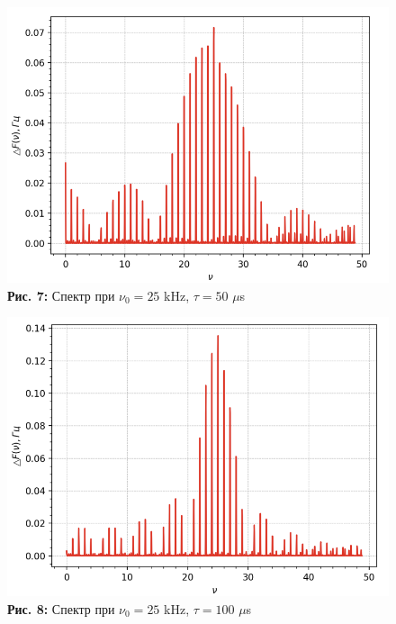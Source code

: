 \documentclass[12pt,a4paper]{scrartcl}
\begin{document}
	\begin{figure}[h]
		\begin{minipage}{0.5\linewidth}
			\begin{center}
				\includegraphics[scale=0.247]{PIC_7.png}
				\\\textbf{Рис. 7:} Спектр при $\nu_0 = 25$ kHz, $\tau = 50$ $\mu$s
			\end{center}
		\end{minipage}
		\begin{minipage}{0.5\linewidth}
			\begin{center}
				\includegraphics[scale=0.25]{PIC_8.png}
				\\\textbf{Рис. 8:} Спектр при $\nu_0 = 25$ kHz, $\tau = 100$ $\mu$s
			\end{center}
		\end{minipage}
	\end{figure}
	
\end{document}
